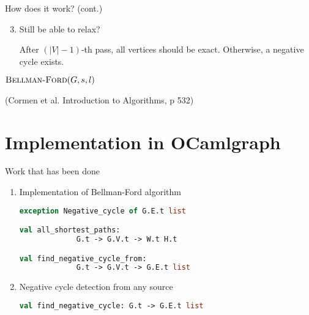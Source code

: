 \documentclass{beamer}
\begin{document}
\begin{frame}{How does it work? (cont.)}

\begin{enumerate}
\setcounter{enumi}{2}

\item \alert{Still be able to relax?}

After $(|V|-1)$-th pass, all vertices should be exact.
Otherwise, a negative cycle exists.

\begin{center}
\end{center}

\end{enumerate}

\end{frame}

\begin{frame}{$\mbox{\sc Bellman-Ford}(G,s,l)$}

\begin{algorithmic}[1]
\ENDFOR
\ENDFOR
{}
\ENDIF
\ENDFOR
{}
\end{algorithmic}

(Cormen et al. Introduction to Algorithms, p 532)

\end {frame}

\section{Implementation in OCamlgraph}
\frame{\sectionpage}

\begin{frame}[fragile]{Work that has been done}

\begin{enumerate}
\item Implementation of Bellman-Ford algorithm

\begin{lstlisting}[language=Ocaml]
exception Negative_cycle of G.E.t list

val all_shortest_paths:
             G.t -> G.V.t -> W.t H.t

val find_negative_cycle_from:
             G.t -> G.V.t -> G.E.t list
\end{lstlisting} \vspace*{10pt}

\pause
\item Negative cycle detection from any source

\begin{lstlisting}[language=Ocaml]
val find_negative_cycle: G.t -> G.E.t list
\end{lstlisting}

\end{enumerate}

\end{frame}
\end{document}
